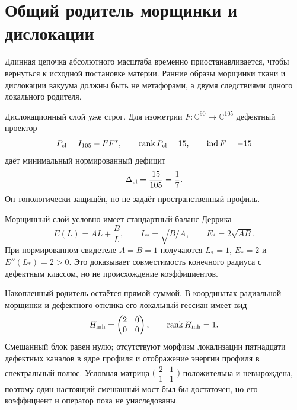 \chapter{Общий родитель морщинки и дислокации}
\label{ch:v10-particle-wrinkle-dislocation-reopening}

Длинная цепочка абсолютного масштаба временно приостанавливается, чтобы
вернуться к исходной постановке материи. Ранние образы морщинки ткани и
дислокации вакуума должны быть не метафорами, а двумя следствиями одного
локального родителя.

Дислокационный слой уже строг. Для изометрии
$F:\mathbb C^{90}\to\mathbb C^{105}$ дефектный проектор
\begin{equation}
 P_{\rm cl}=I_{105}-FF^*,
 \qquad \operatorname{rank} P_{\rm cl}=15,
 \qquad \operatorname{ind}F=-15
\end{equation}
даёт минимальный нормированный дефицит
\begin{equation}
 \Delta_{\rm cl}=\frac{15}{105}=\frac17.
\end{equation}
Он топологически защищён, но не задаёт пространственный профиль.

Морщинный слой условно имеет стандартный баланс Деррика
\begin{equation}
 E(L)=AL+\frac BL,
 \qquad L_*=\sqrt{B/A},
 \qquad E_*=2\sqrt{AB}.
\end{equation}
При нормированном свидетеле $A=B=1$ получаются $L_*=1$, $E_*=2$ и
$E''(L_*)=2>0$. Это доказывает совместимость конечного радиуса с
дефектным классом, но не происхождение коэффициентов.

Накопленный родитель остаётся прямой суммой. В координатах радиальной
морщинки и дефектного отклика его локальный гессиан имеет вид
\begin{equation}
 H_{\rm inh}=\begin{pmatrix}2&0\\0&0\end{pmatrix},
 \qquad \operatorname{rank} H_{\rm inh}=1.
\end{equation}
Смешанный блок равен нулю; отсутствуют морфизм локализации пятнадцати
дефектных каналов в ядре профиля и отображение энергии профиля в
спектральный полюс. Условная матрица
$\bigl(\begin{smallmatrix}2&1\\1&1\end{smallmatrix}\bigr)$ положительна и
невырождена, поэтому один настоящий смешанный мост был бы достаточен, но
его коэффициент и оператор пока не унаследованы.

